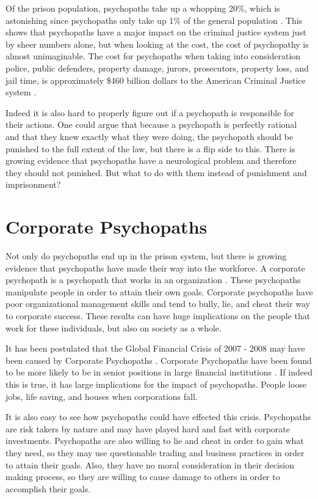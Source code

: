 \documentclass[12pt,jou]{apa}
\begin{document}
Of the prison population, psychopaths take up a whopping 20\%, which is astonishing since psychopaths only take up 1\% of the general population \cite{crimpsych}. This shows that psychopaths have a major impact on the criminal justice system just by sheer numbers alone, but when looking at the cost, the cost of psychopathy is almost unimaginable. The cost for psychopaths when taking into consideration police, public defenders, property damage, jurors, prosecutors, property loss, and jail time, is approximately \$460 billion dollars to the American Criminal Justice system \cite{crimpsych}. 

Indeed it is also hard to properly figure out if a psychopath is responsible for their actions. One could argue that because a psychopath is perfectly rational and that they knew exactly what they were doing, the psychopath should be punished to the full extent of the law, but there is a flip side to this. There is growing evidence that psychopaths have a neurological problem \cite{crimpsych} and therefore they should not punished. But what to do with them instead of punishment and imprisonment? 


\section{Corporate Psychopaths}

Not only do psychopaths end up in the prison system, but there is growing evidence that psychopaths have made their way into the workforce. A corporate psychopath is a psychopath that works in an organization \cite{corptheory}. These psychopaths manipulate people in order to attain their own goals. Corporate psychopaths have poor organizational management skills and tend to bully, lie, and cheat their way to corporate success. These results can have huge implications on the people that work for these individuals, but also on society as a whole.

It has been postulated that the Global Financial Crisis of 2007 - 2008 may have been caused by Corporate Psychopaths \cite{corptheory}. Corporate Psychopaths have been found to be more likely to be in senior positions in large financial institutions \cite<as cited in>{corptheory}. If indeed this is true, it has large implications for the impact of psychopaths. People loose jobs, life saving, and houses when corporations fall. 

It is also easy to see how psychopaths could have effected this crisis. Psychopaths are risk takers by nature and may have played hard and fast with corporate investments. Psychopaths are also willing to lie and cheat in order to gain what they need, so they may use questionable trading and business practices in order to attain their goals. Also, they have no moral consideration in their decision making process, so they are willing to cause damage to others in order to accomplish their goals. 
\end{document}
